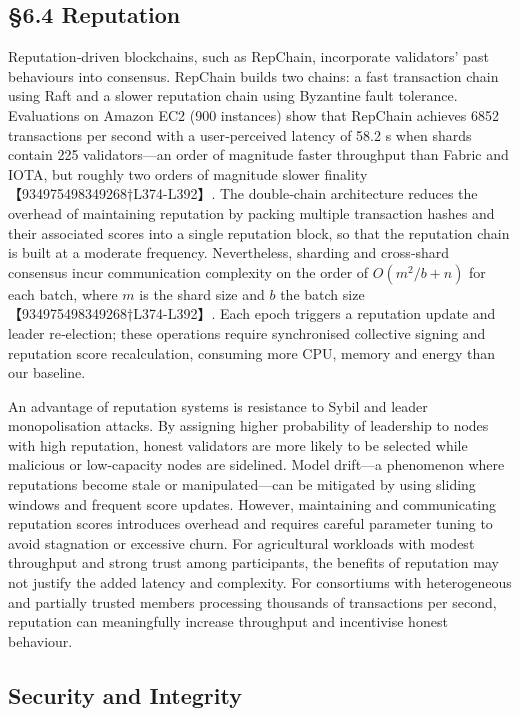 \subsection{\S6.4 Reputation}
\label{subsec:reputation-discussion}

Reputation‑driven blockchains, such as RepChain, incorporate validators’ past behaviours into consensus.  RepChain builds two chains: a fast transaction chain using Raft and a slower reputation chain using Byzantine fault tolerance.  Evaluations on Amazon EC2 (900 instances) show that RepChain achieves 6852 transactions per second with a user‑perceived latency of 58.2 s when shards contain 225 validators—an order of magnitude faster throughput than Fabric and IOTA, but roughly two orders of magnitude slower finality【934975498349268†L374-L392】.  The double‑chain architecture reduces the overhead of maintaining reputation by packing multiple transaction hashes and their associated scores into a single reputation block, so that the reputation chain is built at a moderate frequency.  Nevertheless, sharding and cross‑shard consensus incur communication complexity on the order of \(O(m^2/b + n)\) for each batch, where \(m\) is the shard size and \(b\) the batch size【934975498349268†L374-L392】.  Each epoch triggers a reputation update and leader re‑election; these operations require synchronised collective signing and reputation score recalculation, consuming more CPU, memory and energy than our baseline.

An advantage of reputation systems is resistance to Sybil and leader monopolisation attacks.  By assigning higher probability of leadership to nodes with high reputation, honest validators are more likely to be selected while malicious or low‑capacity nodes are sidelined.  Model drift—a phenomenon where reputations become stale or manipulated—can be mitigated by using sliding windows and frequent score updates.  However, maintaining and communicating reputation scores introduces overhead and requires careful parameter tuning to avoid stagnation or excessive churn.  For agricultural workloads with modest throughput and strong trust among participants, the benefits of reputation may not justify the added latency and complexity.  For consortiums with heterogeneous and partially trusted members processing thousands of transactions per second, reputation can meaningfully increase throughput and incentivise honest behaviour.

\subsection{Security and Integrity}
\label{subsec:security-integrity}

